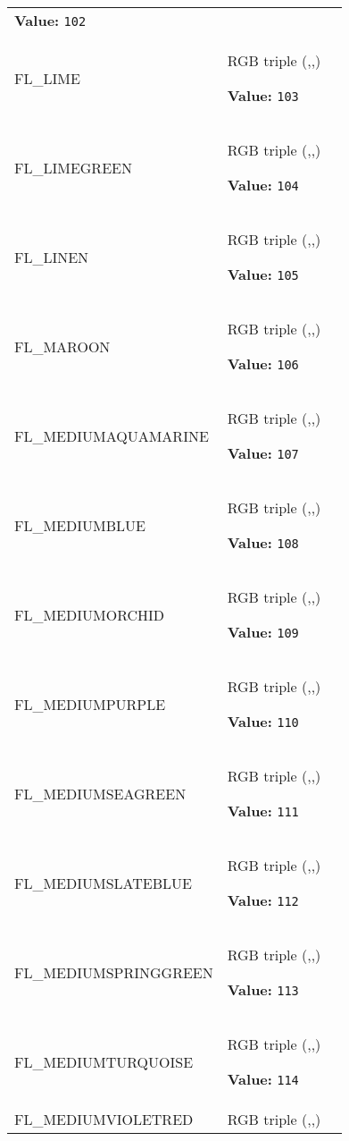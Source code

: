 \begin{longtable}{|p{\varnamewidth}|p{\vardescrwidth}|l}
\textbf{Value:} 
{\tt 102}&\\
\cline{1-2}
\raggedright F\-L\-\_\-L\-I\-M\-E\- & \raggedright RGB triple (,,)

\textbf{Value:} 
{\tt 103}&\\
\cline{1-2}
\raggedright F\-L\-\_\-L\-I\-M\-E\-G\-R\-E\-E\-N\- & \raggedright RGB triple (,,)

\textbf{Value:} 
{\tt 104}&\\
\cline{1-2}
\raggedright F\-L\-\_\-L\-I\-N\-E\-N\- & \raggedright RGB triple (,,)

\textbf{Value:} 
{\tt 105}&\\
\cline{1-2}
\raggedright F\-L\-\_\-M\-A\-R\-O\-O\-N\- & \raggedright RGB triple (,,)

\textbf{Value:} 
{\tt 106}&\\
\cline{1-2}
\raggedright F\-L\-\_\-M\-E\-D\-I\-U\-M\-A\-Q\-U\-A\-M\-A\-R\-I\-N\-E\- & \raggedright RGB triple (,,)

\textbf{Value:} 
{\tt 107}&\\
\cline{1-2}
\raggedright F\-L\-\_\-M\-E\-D\-I\-U\-M\-B\-L\-U\-E\- & \raggedright RGB triple (,,)

\textbf{Value:} 
{\tt 108}&\\
\cline{1-2}
\raggedright F\-L\-\_\-M\-E\-D\-I\-U\-M\-O\-R\-C\-H\-I\-D\- & \raggedright RGB triple (,,)

\textbf{Value:} 
{\tt 109}&\\
\cline{1-2}
\raggedright F\-L\-\_\-M\-E\-D\-I\-U\-M\-P\-U\-R\-P\-L\-E\- & \raggedright RGB triple (,,)

\textbf{Value:} 
{\tt 110}&\\
\cline{1-2}
\raggedright F\-L\-\_\-M\-E\-D\-I\-U\-M\-S\-E\-A\-G\-R\-E\-E\-N\- & \raggedright RGB triple (,,)

\textbf{Value:} 
{\tt 111}&\\
\cline{1-2}
\raggedright F\-L\-\_\-M\-E\-D\-I\-U\-M\-S\-L\-A\-T\-E\-B\-L\-U\-E\- & \raggedright RGB triple (,,)

\textbf{Value:} 
{\tt 112}&\\
\cline{1-2}
\raggedright F\-L\-\_\-M\-E\-D\-I\-U\-M\-S\-P\-R\-I\-N\-G\-G\-R\-E\-E\-N\- & \raggedright RGB triple (,,)

\textbf{Value:} 
{\tt 113}&\\
\cline{1-2}
\raggedright F\-L\-\_\-M\-E\-D\-I\-U\-M\-T\-U\-R\-Q\-U\-O\-I\-S\-E\- & \raggedright RGB triple (,,)

\textbf{Value:} 
{\tt 114}&\\
\cline{1-2}
\raggedright F\-L\-\_\-M\-E\-D\-I\-U\-M\-V\-I\-O\-L\-E\-T\-R\-E\-D\- & \raggedright RGB triple (,,)


\end{longtable}
